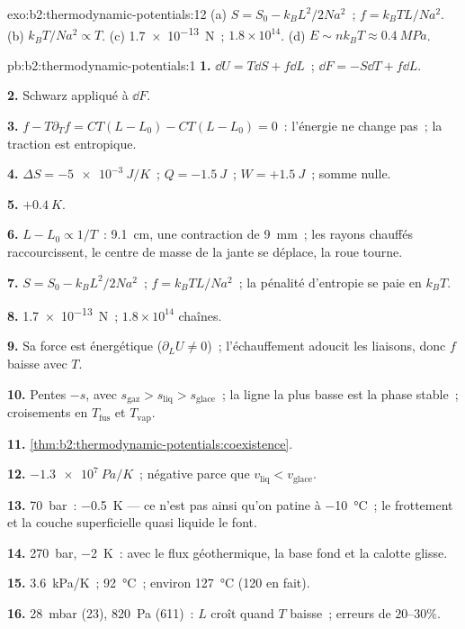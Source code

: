 \begin{solution}{exo:b2:thermodynamic-potentials:12}
(a) $S = S_0 - k_BL^2/2Na^2$~; $f = k_BTL/Na^2$. (b) $k_BT/Na^2 \propto T$. (c)
\qty{1.7e-13}{N}~; $1.8 \times 10^{14}$. (d) $E \sim nk_BT \approx \qty{0.4}{MPa}$.
\end{solution}

\begin{solution}{pb:b2:thermodynamic-potentials:1}
\textbf{1.} $\dd U = T\dd S + f\dd L$~; $\dd F = -S\dd T + f\dd L$.

\textbf{2.} Schwarz appliqué à $\dd F$.

\textbf{3.} $f - T\partial_Tf = CT(L - L_0) - CT(L - L_0) = 0$~: l'énergie
ne change pas~; la traction est entropique.

\textbf{4.} $\Delta S = \qty{-5e-3}{J/K}$~; $Q = \qty{-1.5}{J}$~; $W = +\qty{1.5}{J}$~; somme
nulle.

\textbf{5.} $+\qty{0.4}{K}$.

\textbf{6.} $L - L_0 \propto 1/T$~: \qty{9.1}{cm}, une contraction de \qty{9}{mm}~; les
rayons chauffés raccourcissent, le centre de masse de la jante se déplace, la roue
tourne.

\textbf{7.} $S = S_0 - k_BL^2/2Na^2$~; $f = k_BTL/Na^2$~; la pénalité d'entropie se
paie en $k_BT$.

\textbf{8.} \qty{1.7e-13}{N}~; $1.8 \times 10^{14}$ chaînes.

\textbf{9.} Sa force est énergétique ($\partial_LU \ne 0$)~; l'échauffement adoucit
les liaisons, donc $f$ baisse avec $T$.

\textbf{10.} Pentes $-s$, avec $s_{\text{gaz}} > s_{\text{liq}} > s_{\text{glace}}$~; la
ligne la plus basse est la phase stable~; croisements en $T_{\text{fus}}$ et $T_{\text{vap}}$.

\textbf{11.} \cref{thm:b2:thermodynamic-potentials:coexistence}.

\textbf{12.} $\qty{-1.3e7}{Pa/K}$~; négative parce que $v_{\text{liq}} < v_{\text{glace}}$.

\textbf{13.} \qty{70}{bar}~: \qty{-0.5}{K} --- ce n'est pas ainsi qu'on patine à
\qty{-10}{\celsius}~; le frottement et la couche superficielle quasi liquide le font.

\textbf{14.} \qty{270}{bar}, \qty{-2}{K}~: avec le flux géothermique, la
base fond et la calotte glisse.

\textbf{15.} \qty{3.6}{kPa/K}~; \qty{92}{\celsius}~; environ \qty{127}{\celsius}
(\qty{120}{} en fait).

\textbf{16.} \qty{28}{mbar} (\qty{23}{}), \qty{820}{Pa} (\qty{611}{})~: $L$ croît quand $T$
baisse~; erreurs de $20$--$30\%$.


\end{solution}
